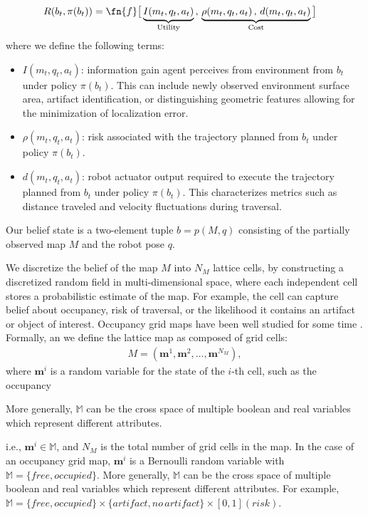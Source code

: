 \documentclass{article}
\begin{document}
\begin{align}
    R(b_t, \pi(b_t)) &= \fn{f}\big[ \underbrace{I(m_t, q_t, a_t)}_{\text{Utility}} \, , \, \underbrace{\rho(m_t, q_t, a_t) \, , \, d(m_t, q_t, a_t)}_{\text{Cost}} \big]
    \label{eq:reward}
\end{align}
where we define the following terms:
\begin{itemize}[labelindent=0pt,labelwidth=1.25em,leftmargin=!]
    \item $I(m_t, q_t, a_t)$: information gain agent perceives from environment from $b_t$ under policy $\pi(b_t)$. This can include newly observed environment surface area, artifact identification, or distinguishing geometric features allowing for the minimization of localization error.
    \item $\rho(m_t, q_t, a_t)$: risk associated with the trajectory planned from $b_t$ under policy $\pi(b_t)$.
    \item $d(m_t, q_t, a_t)$: robot actuator output required to execute the trajectory planned from $b_t$ under policy $\pi(b_t)$. This characterizes metrics such as distance traveled and velocity fluctuations during traversal. 
\end{itemize}

Our belief state is a two-element tuple $b=p(M,q)$ consisting of the partially observed map $M$ and the robot pose $q$.

We discretize the belief of the map $M$ into $N_M$ lattice cells, by constructing a discretized random field in multi-dimensional space, where each independent cell stores a probabilistic estimate of the map.  For example, the cell can capture belief about occupancy, risk of traversal, or the likelihood it contains an artifact or object of interest.  Occupancy grid maps have been well studied for some time \cite{moravec1985high,elfes1990stochastic}.
%
Formally, an we define the lattice map as composed of grid cells:
\begin{align}
  M = (\mathbf{m}^1, \mathbf{m}^2, \dots, \mathbf{m}^{N_M}),
\end{align}
where $\mathbf{m}^i$ is a random variable for the state of the $i$-th cell, such as the occupancy 


More generally, $\mathbb{M}$ can be the cross space of multiple boolean and real variables which represent different attributes.


i.e., $\mathbf{m}^i \in \mathbb{M}$, and
$N_M$ is the total number of grid cells in the map.
In the case of an occupancy grid map, $\mathbf{m}^i$ is a Bernoulli random variable with $\mathbb{M} = \{free, occupied\}$.  More generally, $\mathbb{M}$ can be the cross space of multiple boolean and real variables which represent different attributes.  For example, $\mathbb{M} = \{free, occupied\}\times\{artifact, no\, artifact\}\times [0,1] (risk)$.
\end{document}
